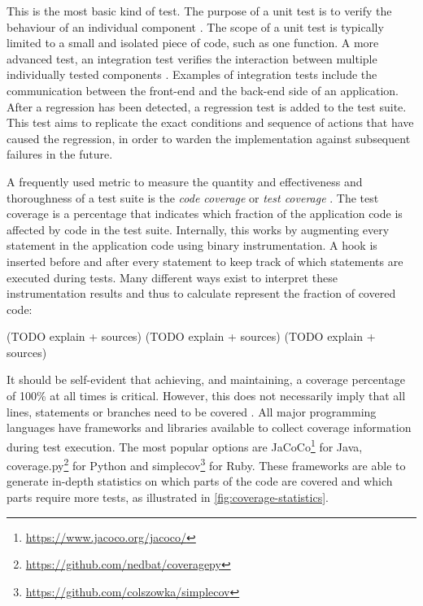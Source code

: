 \begin{enumerate}
	 This is the most basic kind of test. The purpose of a unit test is to verify the behaviour of an individual component \cite{whittaker2000}. The scope of a unit test is typically limited to a small and isolated piece of code, such as one function.
	 A more advanced test, an integration test verifies the interaction between multiple individually tested components \cite{whittaker2000}. Examples of integration tests include the communication between the front-end and the back-end side of an application.
	 After a regression has been detected, a regression test \cite[p.~372]{8016712} is added to the test suite. This test aims to replicate the exact conditions and sequence of actions that have caused the regression, in order to warden the implementation against subsequent failures in the future.
\end{enumerate}

\noindent A frequently used metric to measure the quantity and effectiveness and thoroughness of a test suite is the \emph{code coverage} or \emph{test coverage} \cite[p.~467]{8016712}. The test coverage is a percentage that indicates which fraction of the application code is affected by code in the test suite. Internally, this works by augmenting every statement in the application code using binary instrumentation. A hook is inserted before and after every statement to keep track of which statements are executed during tests. Many different ways exist to interpret these instrumentation results and thus to calculate represent the fraction of covered code:

\begin{itemize}
	 (TODO explain + sources)
	 (TODO explain + sources)
	 (TODO explain + sources)
\end{itemize}

It should be self-evident that achieving, and maintaining, a coverage percentage of 100\% at all times is critical. However, this does not necessarily imply that all lines, statements or branches need to be covered \cite{dein_2019}. All major programming languages have frameworks and libraries available to collect coverage information during test execution. The most popular options are JaCoCo\footnote{\url{https://www.jacoco.org/jacoco/}} for Java, coverage.py\footnote{\url{https://github.com/nedbat/coveragepy}} for Python and simplecov\footnote{\url{https://github.com/colszowka/simplecov}} for Ruby. These frameworks are able to generate in-depth statistics on which parts of the code are covered and which parts require more tests, as illustrated in \autoref{fig:coverage-statistics}.

